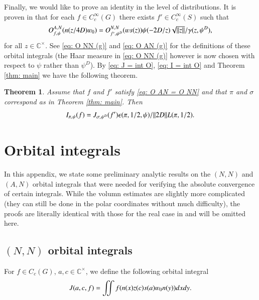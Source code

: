 \documentclass{amsproc}
\newcommand{\BC}{{\mathbb {C}}} \newcommand{\BD}{{\mathbb {D}}}
\def\BCx{\BC^{\times}}
\def\shskip{\hskip 0.5 pt}
\theoremstyle{plain}
\newtheorem{thm}{Theorem}[section] \newtheorem{cor}[thm]{Corollary}
\numberwithin{equation}{section}
\begin{document}
Finally, we would like to prove an identity in the level of distributions. %
It is proven in \cite{Jacquet-RTF} that for each $f \in C_c^\infty (G)$ there exists $f' \in C_c^\infty (S)$ such that
\begin{equation}\label{eq: O AN = O NN}
O^{A, \shskip N}_{f, \shskip \psi} (n(z/4D) \varw_0) = O^{N, \shskip N}_{f', \shskip \psi^D} (\varw s(z)) \psi (-2D/z) {\textstyle \sqrt {\|z\|}}/ \gamma (z, \psi^D),
\end{equation}
for all $z \in \BCx$. See \eqref{eq: O NN (g)} and \eqref{eq: O AN (g)} for the definitions of these orbital integrals (the Haar measure in \eqref{eq: O NN (g)} however is now chosen with respect to $\psi$ rather than $\psi^D$).   By \eqref{eq: J = int O}, \eqref{eq: I = int O} and Theorem \ref{thm: main} we have the following theorem.

\begin{thm}
Assume that $f$ and $f '$ satisfy \eqref{eq: O AN = O NN} and that $\pi$ and $\sigma$ correspond as in Theorem {\rm\ref{thm: main}}. Then
\begin{equation}
I_{\pi,\shskip \psi} (f) = J_{\sigma,\shskip \psi^D} (f') \epsilon (\pi, 1/2, \psi)    / \|2 D\| L (\pi, 1/2).
\end{equation}
\end{thm}







	
	\appendix
	
	\section{Orbital integrals}
	
	 In this appendix, we state some preliminary analytic results on the $(N,N)$ and $(A,N)$ orbital integrals that were needed for verifying the absolute convergence of certain integrals. While the volumn estimates are slightly more complicated (they can still be done in the polar coordinates without much difficulty), the proofs are literally identical with those for the real case in \cite[\S 4.1, 4.2]{BaruchMao-Real} and will be omitted here.
	
   \subsection{$(N,N)$ orbital integrals}
   For $f\in C_c (G)$, $a,c\in \BCx$, we define the following orbital integral
  \begin{equation}\label{def: J (a,c,f)}
   J(a,c,f)=\iint f(n(x)z(c)s(a)\varw_0n(y))dxdy.
  \end{equation}
\end{document}
